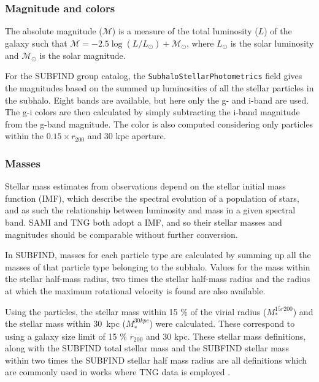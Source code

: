 \subsubsection{Magnitude and colors}

The absolute magnitude ($\mathcal{M}$) is a measure of the total luminosity ($L$) of the galaxy such that $\mathcal{M} = -2.5 \log(L/L_\odot) + \mathcal{M}_\odot$, where $L_\odot$ is the solar luminosity and $\mathcal{M}_\odot$ is the solar magnitude.

For the SUBFIND group catalog, the \texttt{SubhaloStellarPhotometrics} field gives the magnitudes based on the summed up luminosities of all the stellar particles in the subhalo. Eight bands are available, but here only the g- and i-band are used. The g-i colors are then calculated by simply subtracting the i-band magnitude from the g-band magnitude. The color is also computed considering only particles within the $0.15 \times r_{200}$ and 30 kpc aperture.

\subsubsection{Masses}

Stellar mass estimates from observations depend on the stellar initial mass function (IMF), which describe the spectral evolution of a population of stars, and as such the relationship between luminosity and mass in a given spectral band. SAMI and TNG both adopt a \textcite{Chabrier2003} IMF, and so their stellar masses and magnitudes should be comparable without further conversion.

In SUBFIND, masses for each particle type are calculated by summing up all the masses of that particle type belonging to the subhalo. Values for the mass within the stellar half-mass radius, two times the stellar half-mass radius and the radius at which the maximum rotational velocity is found are also available.

Using the particles, the stellar mass within 15 \% of the virial radius ($M_\ast^{15r200}$) and the stellar mass within 30$\,$ kpc ($M_\ast^{30kpc}$) were calculated. These correspond to using a galaxy size limit of 15 \% $r_{200}$ and 30 kpc. These stellar mass definitions, along with the SUBFIND total stellar mass and the SUBFIND stellar mass within two times the SUBFIND stellar half mass radius are all definitions which are commonly used in works where TNG data is employed \parencite[see e.g.,][]{Vazquez2020, Ferrero2020, Lu2020, Rodriguez2020}.

